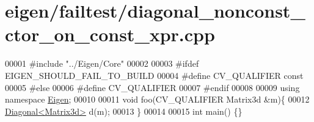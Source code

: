 \hypertarget{eigen_2failtest_2diagonal__nonconst__ctor__on__const__xpr_8cpp_source}{}\section{eigen/failtest/diagonal\+\_\+nonconst\+\_\+ctor\+\_\+on\+\_\+const\+\_\+xpr.cpp}
\label{eigen_2failtest_2diagonal__nonconst__ctor__on__const__xpr_8cpp_source}

\begin{DoxyCode}
00001 \textcolor{preprocessor}{#include "../Eigen/Core"}
00002 
00003 \textcolor{preprocessor}{#ifdef EIGEN\_SHOULD\_FAIL\_TO\_BUILD}
00004 \textcolor{preprocessor}{#define CV\_QUALIFIER const}
00005 \textcolor{preprocessor}{#else}
00006 \textcolor{preprocessor}{#define CV\_QUALIFIER}
00007 \textcolor{preprocessor}{#endif}
00008 
00009 \textcolor{keyword}{using namespace }\hyperlink{namespace_eigen}{Eigen};
00010 
00011 \textcolor{keywordtype}{void} foo(CV\_QUALIFIER Matrix3d &m)\{
00012     \hyperlink{group___core___module_class_eigen_1_1_diagonal}{Diagonal<Matrix3d>} d(m);
00013 \}
00014 
00015 \textcolor{keywordtype}{int} main() \{\}
\end{DoxyCode}
